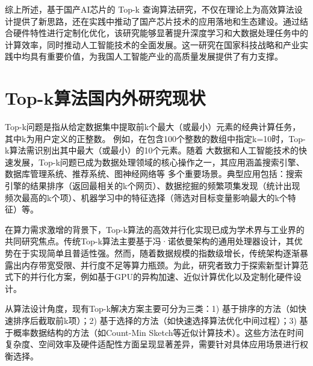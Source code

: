 综上所述，基于国产AI芯片的 Top-k 查询算法研究，不仅在理论上为高效算法设计提供了新思路，还在实践中推动了国产芯片技术的应用落地和生态建设。通过结合硬件特性进行定制化优化，该研究能够显著提升深度学习和大数据处理任务中的计算效率，同时推动人工智能技术的全面发展。这一研究在国家科技战略和产业实践中均具有重要价值，为我国人工智能产业的高质量发展提供了有力支撑。

\section{Top-k算法国内外研究现状}

Top-k问题是指从给定数据集中提取前k个最大（或最小）元素的经典计算任务，其中k为用户定义的正整数。
例如，在包含100个整数的数组中指定k=10时，Top-k算法需识别出其中最大（或最小）的10个元素\cite{hoare1961algorithm}。‌随着
大数据和人工智能技术的快速发展，Top-k问题已成为数据处理领域的核心操作之一，其应用涵盖搜索引擎、数据库管理系统、推荐系统、图神经网络等
多个重要场景‌。典型应用包括：‌搜索引擎的结果排序（返回最相关的k个网页）、数据挖掘的频繁项集发现（统计出现频次最高的k个项）、机器学习中的特征选择（筛选对目标变量影响最大的k个特征）等‌。

‌在算力需求激增的背景下，Top-k算法的高效并行化实现已成为学术界与工业界的共同研究焦点‌\cite{zhang2023parallel}\cite{Gaihre_Zheng_Weitze_Li_Song_Ding_Li_Liu_2021}。‌传统Top-k算法主要基于冯·诺依曼架构的通用处理器设计，其优势在于实现简单且普适性强‌。‌然而，随着数据规模的指数级增长，传统架构逐渐暴露出内存带宽受限、并行度不足等算力瓶颈‌。‌为此，研究者致力于探索新型计算范式下的并行化方案，例如基于GPU的异构加速、近似计算优化以及定制化硬件设计‌。

‌从算法设计角度，现有Top-k解决方案主要可分为三类‌：1) ‌基于排序的方法‌（如快速排序后截取前k项）；2) ‌基于选择的方法‌（如快速选择算法优化中间过程）；3) ‌基于概率数据结构的方法‌（如Count-Min Sketch等近似计算技术）\cite{baidu2024topk}。‌这些方法在时间复杂度、空间效率及硬件适配性方面呈现显著差异，需要针对具体应用场景进行权衡选择‌。

